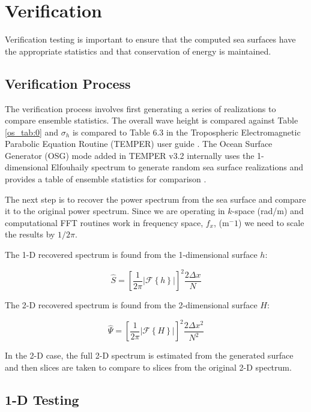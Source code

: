 \section {Verification}
Verification testing is important to ensure that the computed sea surfaces have the appropriate statistics and that conservation of energy is maintained.

\subsection {Verification Process}
The verification process involves first generating a series of realizations to compare ensemble statistics. The overall wave height is compared against Table \ref{os_tab:0} and $\sigma_h$ is compared to Table 6.3 in the Tropospheric Electromagnetic Parabolic Equation Routine (TEMPER) user guide \cite{temper_guide}. The Ocean Surface Generator (OSG) mode added in TEMPER v3.2 internally uses the 1-dimensional Elfouhaily spectrum to generate random sea surface realizations and provides a table of ensemble statistics for comparison \cite{temper_guide}. 

The next step is to recover the power spectrum from the sea surface and compare it to the original power spectrum. Since we are operating in $k$-space (rad/m) and computational FFT routines work in frequency space, $f_x$, (m$^-1$) we need to scale the results by $1/2\pi$. 

The 1-D recovered spectrum is found from the 1-dimensional surface $h$:

\begin{equation}
\label{os_eq:ab}
\hat{S} = \left[\frac{1}{2\pi}\left|\mathcal{F}\left\{ h\right\} \right| \right]^2\frac{2 \Delta x}{N}
\end{equation}
\renewcommand{\baselinestretch}{2} \small\normalsize

The 2-D recovered spectrum is found from the 2-dimensional surface $H$:

\begin{equation}
\label{os_eq:ba}
\hat{\Psi} = \left[\frac{1}{2\pi}\left|\mathcal{F}\left\{ H\right\} \right| \right]^2\frac{2 \Delta x^2}{N^2}
\end{equation}
\renewcommand{\baselinestretch}{2} \small\normalsize

In the 2-D case, the full 2-D spectrum is estimated from the generated surface and then slices are taken to compare to slices from the original 2-D spectrum. 

\subsection {1-D Testing}
